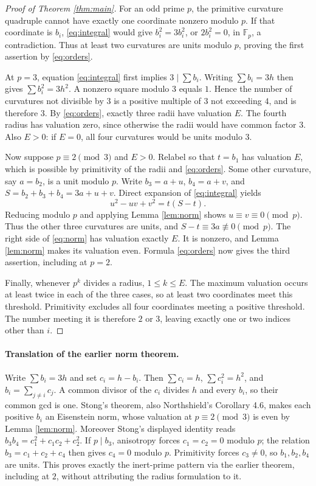 \documentclass[11pt]{article}
\begin{document}
\begin{proof}[Proof of Theorem \ref{thm:main}]
For an odd prime $p$, the primitive curvature quadruple cannot have exactly
one coordinate nonzero modulo $p$. If that coordinate is $b_i$,
\eqref{eq:integral} would give $b_i^2=3b_i^2$, or $2b_i^2=0$,
in $\mathbb F_p$, a contradiction. Thus at least two curvatures are
units modulo $p$, proving the first assertion by \eqref{eq:orders}.

At $p=3$, equation \eqref{eq:integral} first implies
$3\mid\sum b_i$. Writing $\sum b_i=3h$ then gives
$\sum b_i^2=3h^2$. A nonzero square modulo $3$ equals $1$.
Hence the number of curvatures not divisible by $3$ is a positive
multiple of $3$ not exceeding $4$, and is therefore $3$.
By \eqref{eq:orders}, exactly three radii have valuation $E$.
The fourth radius has valuation zero, since otherwise the radii would
have common factor $3$. Also $E>0$: if $E=0$, all four curvatures
would be units modulo $3$.

Now suppose $p\equiv2\pmod3$ and $E>0$. Relabel so that
$t=b_1$ has valuation $E$, which is possible by primitivity of the
radii and \eqref{eq:orders}. Some other curvature, say $a=b_2$,
is a unit modulo $p$. Write $b_3=a+u$, $b_4=a+v$, and
$S=b_2+b_3+b_4=3a+u+v$. Direct expansion of
\eqref{eq:integral} yields
\begin{equation}\label{eq:norm}
 u^2-uv+v^2=t(S-t).
\end{equation}
Reducing modulo $p$ and applying Lemma \ref{lem:norm} shows
$u\equiv v\equiv0\pmod p$. Thus the other three curvatures are units,
and $S-t\equiv3a\not\equiv0\pmod p$. The right side of
\eqref{eq:norm} has valuation exactly $E$. It is nonzero, and
Lemma \ref{lem:norm} makes its valuation even. Formula
\eqref{eq:orders} now gives the third assertion, including at $p=2$.

Finally, whenever $p^k$ divides a radius, $1\le k\le E$.
The maximum valuation occurs at least twice in each of the three cases,
so at least two coordinates meet this threshold. Primitivity excludes
all four coordinates meeting a positive threshold. The number meeting it
is therefore $2$ or $3$, leaving exactly one or two indices other than $i$.
\end{proof}

\paragraph{Translation of the earlier norm theorem.}
Write $\sum b_i=3h$ and set $c_i=h-b_i$. Then
$\sum c_i=h$, $\sum c_i^2=h^2$, and
$b_i=\sum_{j\ne i}c_j$. A common divisor of the $c_i$ divides $h$
and every $b_i$, so their common gcd is one. Stong's theorem, also
Northshield's Corollary 4.6, makes each positive $b_i$ an Eisenstein
norm, whose valuation at $p\equiv2\pmod3$ is even by Lemma
\ref{lem:norm}. Moreover Stong's displayed identity reads
$b_3b_4=c_1^2+c_1c_2+c_2^2$. If $p\mid b_3$, anisotropy forces
$c_1=c_2=0$ modulo $p$; the relation
$b_3=c_1+c_2+c_4$ then gives $c_4=0$ modulo $p$.
Primitivity forces $c_3\ne0$, so $b_1,b_2,b_4$ are units.
This proves exactly the inert-prime pattern via the earlier theorem,
including at $2$, without attributing the radius formulation to it.
\end{document}
